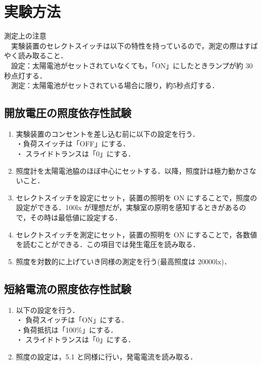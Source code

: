 \section{実験方法}
測定上の注意\\
　実験装置のセレクトスイッチは以下の特性を持っているので，測定の際はすばやく読み取ること．\\
　設定：太陽電池がセットされていなくても，「ON」にしたときランプが約 30 秒点灯する． \\
　測定：太陽電池がセットされている場合に限り，約5秒点灯する．\\

\subsection{開放電圧の照度依存性試験}
\begin{enumerate}
  \item 実験装置のコンセントを差し込む前に以下の設定を行う．\\
  ・負荷スイッチは「OFF」にする．\\
  ・ スライドトランスは「0」にする．
  \item 照度計を太陽電池脇のほぼ中心にセットする．以降，照度計は極力動かさないこと．
  \item セレクトスイッチを設定にセット，装置の照明を ON にすることで，照度の設定ができる．100lx が理想だが，実験室の原明を感知するときがあるので，その時は最低値に設定する．
  \item セレクトスイッチを測定にセット，装置の照明を ON にすることで，各数値を読むことができる．この項目では発生電圧を読み取る．
  \item 照度を対数的に上げていき同様の測定を行う(最高照度は 20000lx)．
\end{enumerate}

\subsection{短絡電流の照度依存性試験}
\begin{enumerate}
  \item 以下の設定を行う．\\
  ・ 負荷スイッチは「ON」にする．\\
  ・負荷抵抗は「100\%」にする．\\
  ・ スライドトランスは「0」にする．
  \item 照度の設定は，5.1 と同様に行い，発電電流を読み取る．
\end{enumerate}

